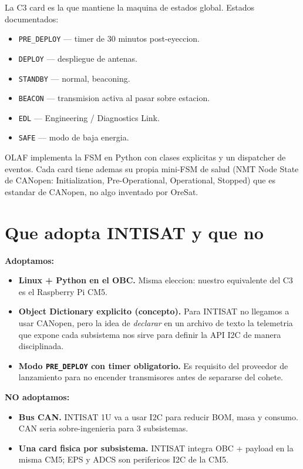 \documentclass[11pt,a4paper,oneside,openright]{book}
\begin{document}
La C3 card es la que mantiene la maquina de estados global. Estados
documentados:

\begin{itemize}[leftmargin=2em]
  \item \texttt{PRE\_DEPLOY} --- timer de 30 minutos post-eyeccion.
  \item \texttt{DEPLOY} --- despliegue de antenas.
  \item \texttt{STANDBY} --- normal, beaconing.
  \item \texttt{BEACON} --- transmision activa al pasar sobre
    estacion.
  \item \texttt{EDL} --- Engineering / Diagnostics Link.
  \item \texttt{SAFE} --- modo de baja energia.
\end{itemize}

OLAF implementa la FSM en Python con clases explicitas y un dispatcher
de eventos. Cada card tiene ademas su propia mini-FSM de salud (NMT
Node State de CANopen: Initialization, Pre-Operational, Operational,
Stopped) que es estandar de CANopen, no algo inventado por OreSat.

\section{Que adopta INTISAT y que no}

\begin{logrado}
\textbf{Adoptamos:}
\begin{itemize}[leftmargin=2em]
  \item \textbf{Linux + Python en el OBC.} Misma eleccion: nuestro
    equivalente del C3 es el Raspberry Pi CM5.
  \item \textbf{Object Dictionary explicito (concepto).} Para
    INTISAT no llegamos a usar CANopen, pero la idea de \emph{declarar}
    en un archivo de texto la telemetria que expone cada subsistema
    nos sirve para definir la API I2C de manera disciplinada.
  \item \textbf{Modo \texttt{PRE\_DEPLOY} con timer obligatorio.} Es
    requisito del proveedor de lanzamiento para no encender
    transmisores antes de separarse del cohete.
\end{itemize}

\textbf{NO adoptamos:}
\begin{itemize}[leftmargin=2em]
  \item \textbf{Bus CAN.} INTISAT 1U va a usar I2C para reducir BOM,
    masa y consumo. CAN seria sobre-ingenieria para 3 subsistemas.
  \item \textbf{Una card fisica por subsistema.} INTISAT integra
    OBC + payload en la misma CM5; EPS y ADCS son perifericos I2C
    de la CM5.
\end{itemize}
\end{logrado}
\end{document}
